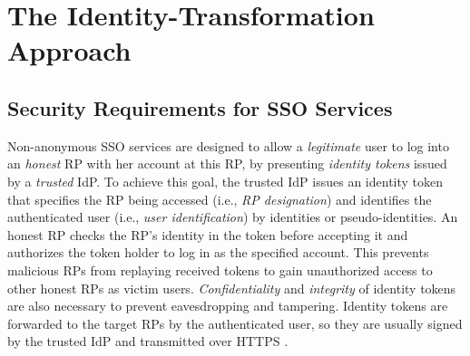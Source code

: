 \section{The Identity-Transformation Approach}
\label{sec:challenge}



\subsection{Security Requirements for SSO Services}
\label{subsec:basicrequirements}

Non-anonymous SSO services \cite{OpenIDConnect,rfc6749,SAML,SAMLIdentifier,NIST2017draft} are designed to allow a \emph{legitimate} user to log into an \emph{honest} RP with her account at this RP, %
by presenting \emph{identity tokens} issued by a \emph{trusted} IdP.
To achieve this goal, the trusted IdP issues an identity token that specifies the RP being accessed (i.e., \emph{RP designation}) and identifies the authenticated user (i.e., \emph{user identification})
        by identities or pseudo-identities.
An honest RP checks the RP's identity in the token before accepting it and authorizes the token holder to log in as the specified account. This prevents malicious RPs from replaying received tokens to gain unauthorized access to other honest RPs as victim users.
\emph{Confidentiality} and \emph{integrity} of identity tokens are also necessary to prevent eavesdropping and tampering. Identity tokens are forwarded to the target RPs by the authenticated user, so they are usually signed by the trusted IdP and transmitted over HTTPS \cite{OpenIDConnect, rfc6749, SAML}.


